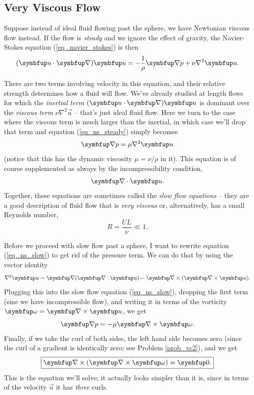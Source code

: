 \subsection{Very Viscous Flow}

Suppose instead of ideal fluid flowing past the sphere, we have Newtonian viscous flow instead.  If the flow is \emph{steady} and we ignore the effect of gravity, the Navier-Stokes equation (\ref{eq_navier_stokes}) is then
\begin{equation}
\label{eq_ns_steady}
(\vec{u} \cdot \grad ) \vec{u} = -\frac{1}{\rho} \grad p + \nu \nabla^2 \vec{u}.
\end{equation}

There are two terms involving velocity in this equation, and their relative strength determines how a fluid will flow.  We've already studied at length flows for which the \emph{inertial term} $(\vec{u} \cdot \grad ) \vec{u}$ is dominant over the \emph{viscous term} $\nu \nabla^2 \vec{u}$ -- that's just ideal fluid flow.  Here we turn to the case where the viscous term is much larger than the inertial, in which case we'll drop that term and equation (\ref{eq_ns_steady}) simply becomes
\begin{equation}
\label{eq_ns_slow}
\grad p = \mu \nabla^2 \vec{u}
\end{equation}
(notice that this has the dynamic viscosity $\mu = \nu / \rho$ in it).  This equation is of course supplemented as always by the incompressibility condition,
\begin{equation}
\grad \cdot \vec{u}.
\end{equation}
Together, these equations are sometimes called the \emph{slow flow equations} -- they are a good description of fluid flow that is \emph{very viscous} or, alternatively, has a small Reynolds number,
\[
R = \frac{UL}{\nu} \ll 1.
\]

Before we proceed with slow flow past a sphere, I want to rewrite equation (\ref{eq_ns_slow}) to get rid of the pressure term.  We can do that by using the vector identity 
\[
\nabla^2 \vec{u} = \grad (\grad \cdot \vec{u}) - \grad \times (\grad \times \vec{u}).
\]
Plugging this into the slow flow equation (\ref{eq_ns_slow}), dropping the first term (sine we have incompressible flow), and writing it in terms of the vorticity $\vec{\omega} = \grad \times \vec{u}$, we get
\begin{equation}
\label{eq_ns_slow_p}
\grad p =  -\mu \grad \times \vec{\omega}.
\end{equation}
Finally, if we take the curl of both sides, the left hand side becomes zero (since the curl of a gradient is identically zero; see Problem \ref{prob_vc2}), and we get
\begin{equation}
\label{eq_slow_flow_curl}
\boxed{
\grad \times (\grad \times \vec{\omega}) = \vec{0}.
}
\end{equation}
This is the equation we'll solve; it actually looks simpler than it is, since in terms of the velocity $\vec{u}$ it has \emph{three} curls.

